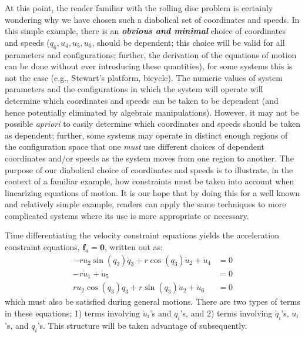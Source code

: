 \documentclass[smallcondensed,final]{svjour3}                     %
\begin{document}
At this point, the reader familiar with the rolling disc problem is certainly
wondering why we have chosen such a diabolical set of coordinates and speeds.
In this simple example, there is an {\bf \textit{obvious and minimal}} choice of
coordinates and speeds ($q_6, u_4, u_5, u_6$, should be dependent; this choice
will be valid for all parameters and configurations; further, the derivation of
the equations of motion can be done without ever introducing these quantities),
for some systems this is not the case (e.g., Stewart's platform, bicycle). The
numeric values of system parameters and the configurations in which the system
will operate will determine which coordinates and speeds can be taken to be
dependent (and hence potentially eliminated by algebraic manipulations).
However, it may not be possible \textit{apriori} to easily determine which
coordinates and speeds should be taken as dependent; further, some systems may
operate in distinct enough regions of the configuration space that one
\textit{must} use different choices of dependent coordinates and/or speeds as
the system moves from one region to another. The purpose of our diabolical
choice of coordinates and speeds is to illustrate, in the context of a familiar
example, how constraints must be taken into account when linearizing equations
of motion. It is our hope that by doing this for a well known and relatively
simple example, readers can apply the same techniques to more complicated
systems where its use is more appropriate or necessary.

Time differentiating the velocity constraint equations yields the acceleration
constraint equations, $\mathbf{f}_a = \mathbf{0}$, written out as:
\begin{subequations}
\label{rd:f_a}
\begin{align}
    -r u_{2} \sin(q_{3}) \dot{q}_{3} + r \cos(q_{3}) \dot{u}_{2} + \dot{u}_{4} &=
    0\\
    - r \dot{u}_{1} + \dot{u}_{5} &= 0\\
    r u_{2} \cos(q_{3}) \dot{q}_{3} + r \sin(q_{3}) \dot{u}_{2} + \dot{u}_{6} &=
    0
\end{align}
\end{subequations}
which must also be satisfied during general motions. There are two types of
terms in these equations; 1) terms involving $\dot{u}_i$'s and $q_i$'s, and 2)
terms involving $\dot{q}_i$'s, $u_i$'s, and $q_i$'s. This structure will be
taken advantage of subsequently.
\end{document}
